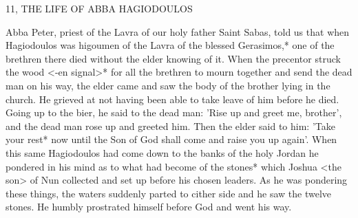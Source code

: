 11, THE LIFE OF ABBA HAGIODOULOS

Abba Peter, priest of the Lavra of our holy father Saint Sabas, told
us that when Hagiodoulos was higoumen of the Lavra of the blessed
Gerasimos,* one of the brethren there died without the elder
knowing of it. When the precentor struck the wood <-en signal>*
for all the brethren to mourn together and send the dead man on
his way, the elder came and saw the body of the brother lying in the
church. He grieved at not having been able to take leave of him
before he died. Going up to the bier, he said to the dead man: 'Rise
up and greet me, brother', and the dead man rose up and greeted
him. Then the elder said to him: 'Take your rest* now until the Son
of God shall come and raise you up again'. When this same
Hagiodoulos had come down to the banks of the holy Jordan he
pondered in his mind as to what had become of the stones* which
Joshua <the son> of Nun collected and set up before his chosen
leaders. As he was pondering these things, the waters suddenly
parted to cither side and he saw the twelve stones. He humbly
prostrated himself before God and went his way.

